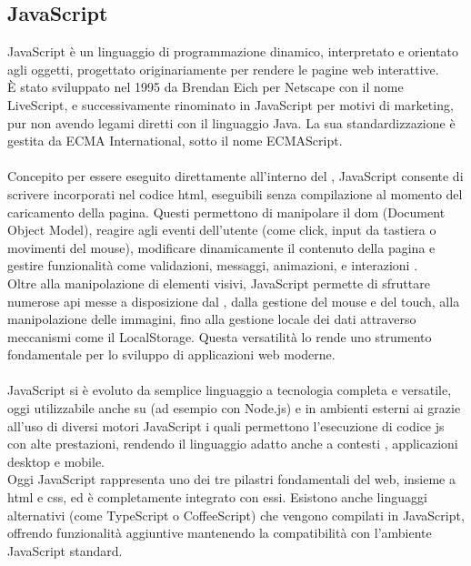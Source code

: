 \subsection{JavaScript}
\noindent JavaScript è un linguaggio di programmazione dinamico, interpretato e orientato agli oggetti, progettato originariamente per rendere le pagine web interattive.\\ 
È stato sviluppato nel 1995 da Brendan Eich per Netscape con il nome LiveScript, e successivamente rinominato in JavaScript per motivi di marketing, pur non avendo legami diretti con il linguaggio Java. La sua standardizzazione è gestita da ECMA International, sotto il nome ECMAScript.\\
\\
Concepito per essere eseguito direttamente all’interno del , JavaScript consente di scrivere  incorporati nel codice \acrshort{html}, eseguibili senza compilazione al momento del caricamento della pagina. Questi  permettono di manipolare il \acrshort{dom} (Document Object Model), reagire agli eventi dell’utente (come click, input da tastiera o movimenti del mouse), modificare dinamicamente il contenuto della pagina e gestire funzionalità come validazioni, messaggi, animazioni, e interazioni .\\
Oltre alla manipolazione di elementi visivi, JavaScript permette di sfruttare numerose \acrshort{api} messe a disposizione dal , dalla gestione del mouse e del touch, alla manipolazione delle immagini, fino alla gestione locale dei dati attraverso meccanismi come il LocalStorage. Questa versatilità lo rende uno strumento fondamentale per lo sviluppo di applicazioni web moderne.\\
\\
JavaScript si è evoluto da semplice linguaggio  a tecnologia completa e versatile, oggi utilizzabile anche su  (ad esempio con Node.js) e in ambienti esterni ai  grazie all’uso di diversi motori JavaScript i quali permettono l’esecuzione di codice \acrshort{js} con alte prestazioni, rendendo il linguaggio adatto anche a contesti , applicazioni desktop e mobile.\\
Oggi JavaScript rappresenta uno dei tre pilastri fondamentali del web, insieme a \acrshort{html} e \acrshort{css}, ed è completamente integrato con essi. Esistono anche linguaggi alternativi (come TypeScript o CoffeeScript) che vengono compilati in JavaScript, offrendo funzionalità aggiuntive mantenendo la compatibilità con l’ambiente JavaScript standard.
